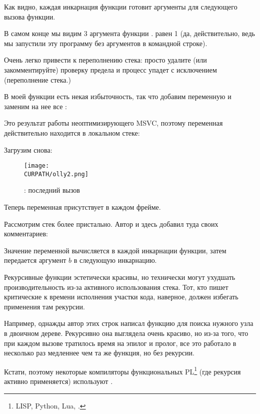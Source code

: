 
Как видно, каждая инкарнация функции готовит аргументы для следующего вызова функции.

В самом конце мы видим 3 аргумента функции \main. 
 равен 1 (да, действительно, ведь мы запустили эту программу
без аргументов в командной строке).

Очень легко привести к переполнению стека: просто удалите (или закомментируйте) проверку
предела и процесс упадет с исключением  (переполнение стека.)


В моей функции есть некая избыточность, так что добавим переменную  и заменим на нее
все :



Это результат работы неоптимизирующего MSVC, поэтому переменная  действительно
находится в локальном стеке:



\clearpage
Загрузим \olly снова:

\begin{figure}[H]
\centering
\texttt{[image: \\CURPATH/olly2.png]}
\caption{\olly: последний вызов \ttf{}}
\label{fig:fib_olly2}
\end{figure}

Теперь переменная  присутствует в каждом фрейме.

\clearpage
Рассмотрим стек более пристально. Автор и здесь добавил туда своих комментариев:



Значение переменной  вычисляется в каждой инкарнации функции, затем передается
аргумент $b$ в следующую инкарнацию.


\label{Recursion_and_tail_call}
\myindex{\Recursion}
Рекурсивные функции эстетически красивы, но технически могут ухудшать производительность
из-за активного использования стека.
Тот, кто пишет критические к времени исполнения участки кода, наверное, должен избегать 
применения там рекурсии.

Например, однажды автор этих строк написал функцию для поиска нужного узла в двоичном дереве. 
Рекурсивно она выглядела очень красиво, но из-за того, что при каждом вызове тратилось время на эпилог и пролог, 
все это работало в несколько раз медленнее чем та же функция, но без рекурсии.

\newcommand{\FnFP}{\footnote{LISP, Python, Lua, \etc{}.}}
Кстати, поэтому некоторые компиляторы функциональных \ac{PL}\FnFP{} (где рекурсия активно применяется) используют .

